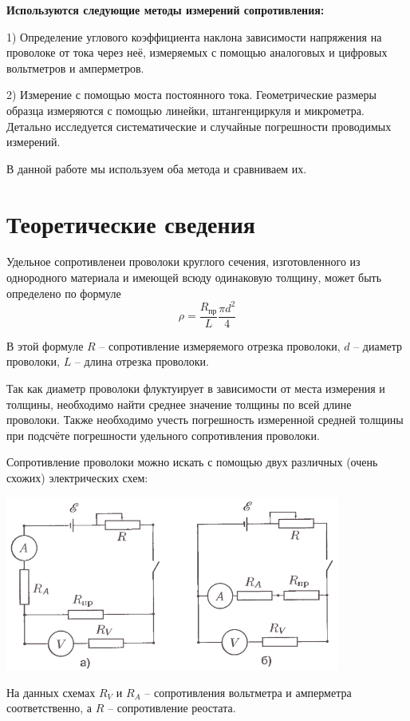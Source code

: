 \documentclass[a4paper, 12pt]{article} %
\begin{document}
\textbf{Используются следующие методы измерений сопротивления:} 

1) Определение углового коэффициента наклона зависимости напряжения на проволоке от тока через неё, измеряемых с помощью аналоговых и цифровых вольтметров и амперметров.

2) Измерение с помощью моста постоянного тока. Геометрические размеры образца измеряются с помощью линейки, штангенциркуля и микрометра. Детально исследуется систематические и случайные погрешности проводимых измерений.

В данной работе мы используем оба метода и сравниваем их.\\


\section{Теоретические сведения}

Удельное сопротивленеи проволоки круглого сечения, изготовленного из однородного материала и имеющей всюду одинаковую толщину, может быть определено по формуле
\[\rho = \frac{R_{\text{пр}}}{L} \frac{\pi d^2}{4}\]

В этой формуле $R$ -- сопротивление измеряемого отрезка проволоки, $d$ -- диаметр проволоки, $L$ -- длина отрезка проволоки.

Так как диаметр проволоки флуктуирует в зависимости от места измерения и толщины, необходимо найти среднее значение толщины по всей длине проволоки. Также необходимо учесть погрешность измеренной средней толщины при подсчёте погрешности удельного сопротивления проволоки.

Сопротивление проволоки можно искать с помощью двух различных (очень схожих) электрических схем:
\begin{center}
	{\includegraphics[width=11cm]{1}}
\end{center}

На данных схемах $R_V$ и $R_A$ -- сопротивления вольтметра и амперметра соответственно, а $R$ -- сопротивление реостата.
\end{document}
